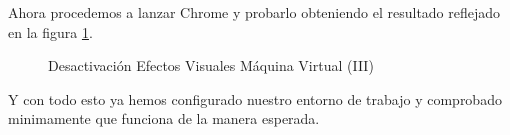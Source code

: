 \documentclass{scrartcl}
\begin{document}
Ahora procedemos a lanzar Chrome y probarlo obteniendo el resultado reflejado en la figura \ref{fig:ConfEcl07}.
\begin{figure}[H]
	
	\centering
	\caption{Desactivación Efectos Visuales Máquina Virtual (III)}
	\label{fig:ConfEcl07}
	
\end{figure}

Y con todo esto ya hemos configurado nuestro entorno de trabajo y comprobado minimamente que funciona de la manera esperada.
	
\end{document}
